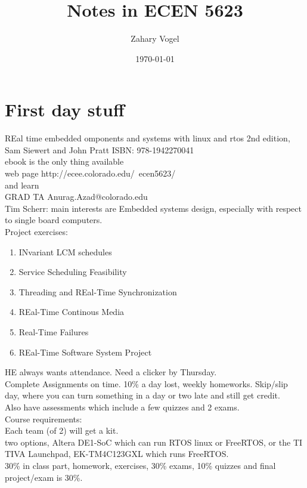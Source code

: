 \documentclass{article}
\author{Zahary Vogel}
\date{\today}
\title{Notes in ECEN 5623}
\begin{document}
\maketitle


\section*{First day stuff}
REal time embedded omponents and systems with linux and rtos 2nd edition, Sam Siewert and John Pratt ISBN: 978-1942270041\\
ebook is the only thing available\\
web page http://ecee.colorado.edu/~ecen5623/\\
and learn\\
GRAD TA Anurag.Azad@colorado.edu\\

Tim Scherr: main interests are Embedded systems design, especially with respect to single board computers.\\


Project exercises:\\
\begin{enumerate}
    \item INvariant LCM schedules
    \item Service Scheduling Feasibility
    \item Threading and REal-Time Synchronization
    \item REal-Time Continous Media
    \item Real-Time Failures
    \item REal-Time Software System Project
\end{enumerate}

HE always wants attendance. Need a clicker by Thursday.\\
Complete Assignments on time. 10\% a day lost, weekly homeworks. Skip/slip day, where you can turn something in a day or two late and still get credit.\\
Also have assessments which include a few quizzes and 2 exams.\\

Course requirements:\\
Each team (of 2) will get a kit.\\
two options, Altera DE1-SoC which can run RTOS linux or FreeRTOS, or the TI TIVA Launchpad, EK-TM4C123GXL which runs FreeRTOS.\\
30\% in class part, homework, exercises, 30\% exams, 10\% quizzes and final project/exam is 30\%.\\
\end{document}
